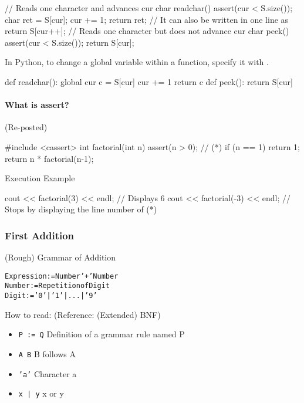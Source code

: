 \begin{cbox}[emph={readchar,peek}]
// Reads one character and advances cur
char readchar() { 
  assert(cur < S.size());    
  char ret = S[cur];
  cur += 1;
  return ret;
  // It can also be written in one line as return S[cur++];
}
// Reads one character but does not advance cur
char peek() { 
  assert(cur < S.size());    
  return S[cur];
}
\end{cbox}

In Python, to change a global variable within a function, specify it with .
\begin{pybox}[emph=global]
def readchar():
    global cur
    c = S[cur]
    cur += 1
    return c
def peek():
    return S[cur]
\end{pybox}

\paragraph{What is assert?} 
(Re-posted)
\begin{cbox}[emph={cassert,assert}]
#include <cassert>
int factorial(int n) {
  assert(n > 0); // (*)
  if (n == 1) return 1;
  return n * factorial(n-1);
}     
\end{cbox}

Execution Example
\begin{cbox}
cout << factorial(3) << endl; // Displays 6
cout << factorial(-3) << endl; // Stops by displaying the line number of (*)
\end{cbox}

\subsubsection{First Addition}

\begin{itembox}[l]{(Rough) Grammar of Addition}
  \begin{alltt}
Expression := Number '+' Number
Number := Repetition of Digit
Digit := '0' | '1' | ... | '9'\end{alltt}  
\end{itembox}

How to read: (Reference: (Extended) BNF)
\begin{itemize}
\setlength{\itemsep}{0pt}
\item \texttt{P := Q} \dingright Definition of a grammar rule named P
\item \texttt{A B} \dingright B follows A
\item \texttt{'a'} \dingright Character a
\item \texttt{x | y} \dingright x or y
\end{itemize}


